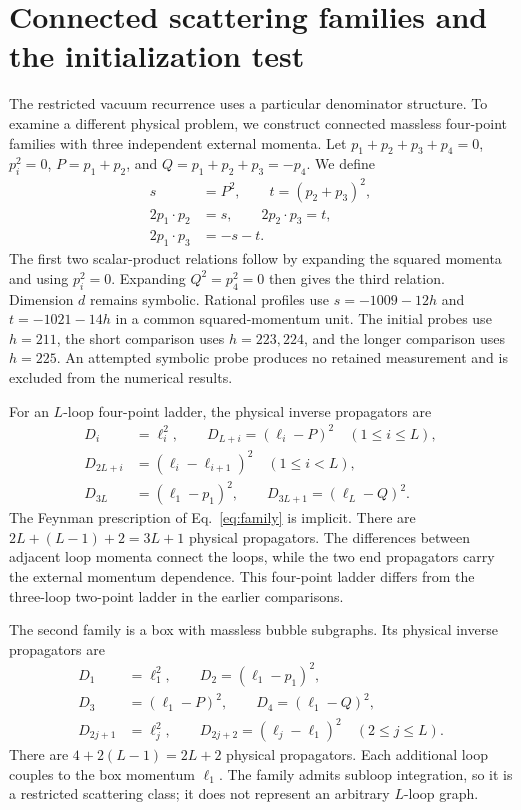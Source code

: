 \section{Connected scattering families and the initialization test}
\label{app:higher-scattering}
The restricted vacuum recurrence uses a particular denominator structure. To examine a different physical problem, we construct connected massless four-point families with three independent external momenta. Let $p_1+p_2+p_3+p_4=0$, $p_i^2=0$, $P=p_1+p_2$, and $Q=p_1+p_2+p_3=-p_4$. We define
\begin{equation}
 \begin{aligned}
 s&=P^2,\qquad t=(p_2+p_3)^2,\\
 2p_1\!\cdot p_2&=s,\qquad 2p_2\!\cdot p_3=t,\\
 2p_1\!\cdot p_3&=-s-t.
 \end{aligned}
 \label{eq:higher-kinematics}
\end{equation}
The first two scalar-product relations follow by expanding the squared momenta and using $p_i^2=0$. Expanding $Q^2=p_4^2=0$ then gives the third relation. Dimension $d$ remains symbolic. Rational profiles use $s=-1009-12h$ and $t=-1021-14h$ in a common squared-momentum unit. The initial probes use $h=211$, the short comparison uses $h=223,224$, and the longer comparison uses $h=225$. An attempted symbolic probe produces no retained measurement and is excluded from the numerical results.

For an $L$-loop four-point ladder, the physical inverse propagators are
\begin{equation}
 \begin{aligned}
 D_i&=\ell_i^2,\qquad D_{L+i}=(\ell_i-P)^2 \quad(1\leq i\leq L),\\
 D_{2L+i}&=(\ell_i-\ell_{i+1})^2 \quad(1\leq i<L),\\
 D_{3L}&=(\ell_1-p_1)^2,\qquad D_{3L+1}=(\ell_L-Q)^2.
 \end{aligned}
 \label{eq:higher-ladder}
\end{equation}
The Feynman prescription of Eq.~\eqref{eq:family} is implicit. There are $2L+(L-1)+2=3L+1$ physical propagators. The differences between adjacent loop momenta connect the loops, while the two end propagators carry the external momentum dependence. This four-point ladder differs from the three-loop two-point ladder in the earlier comparisons.

The second family is a box with massless bubble subgraphs. Its physical inverse propagators are
\begin{equation}
 \begin{aligned}
 D_1&=\ell_1^2,\qquad D_2=(\ell_1-p_1)^2,\\
 D_3&=(\ell_1-P)^2,\qquad D_4=(\ell_1-Q)^2,\\
 D_{2j+1}&=\ell_j^2,\qquad D_{2j+2}=(\ell_j-\ell_1)^2
 \quad(2\leq j\leq L).
 \end{aligned}
 \label{eq:higher-bubble-box}
\end{equation}
There are $4+2(L-1)=2L+2$ physical propagators. Each additional loop couples to the box momentum $\ell_1$. The family admits subloop integration, so it is a restricted scattering class; it does not represent an arbitrary $L$-loop graph.

